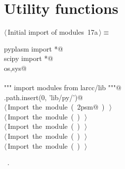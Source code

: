 \documentclass[11pt,oneside]{article}	%
\begin{document}
\appendix
\section{Utility functions}

\begin{flushleft} \small \label{scrap36}
\protect{}$\langle\,$Initial import of modules\nobreak\ {\footnotesize 17a}$\,\rangle\equiv$
\vspace{-1ex}
\begin{list}{}{} \item
\mbox{}\verb@from pyplasm import *@\\
\mbox{}\verb@from scipy import *@\\
\mbox{}\verb@import os,sys@\\
\mbox{}\verb@@\\
\mbox{}\verb@""" import modules from larcc/lib """@\\
\mbox{}\verb@sys.path.insert(0, 'lib/py/')@\\
\mbox{}\verb@@\hbox{$\langle\,$Import the module\nobreak\ ({\footnotesize {}\label{scrap37}
 }\mbox{}\verb@lar2psm@ ) {\footnotesize {}}$\,\rangle$}\verb@@\\
\mbox{}\verb@@\hbox{$\langle\,$Import the module\nobreak\ ({\footnotesize {}\label{scrap38}
 }\mbox{}\verb@simplexn@ ) {\footnotesize {}}$\,\rangle$}\verb@@\\
\mbox{}\verb@@\hbox{$\langle\,$Import the module\nobreak\ ({\footnotesize {}\label{scrap39}
 }\mbox{}\verb@larcc@ ) {\footnotesize {}}$\,\rangle$}\verb@@\\
\mbox{}\verb@@\hbox{$\langle\,$Import the module\nobreak\ ({\footnotesize {}\label{scrap40}
 }\mbox{}\verb@largrid@ ) {\footnotesize {}}$\,\rangle$}\verb@@\\
\mbox{}\verb@@\hbox{$\langle\,$Import the module\nobreak\ ({\footnotesize {}\label{scrap41}
 }\mbox{}\verb@myfont@ ) {\footnotesize {}}$\,\rangle$}\verb@@\\
\mbox{}\verb@@{\NWsep}
\end{list}
\vspace{-1ex}
\footnotesize\addtolength{\baselineskip}{-1ex}
\begin{list}{}{\setlength{\itemsep}{-\parsep}\setlength{\itemindent}{-\leftmargin}}
\item \NWtxtMacroRefIn\ .
\end{list}
\end{flushleft}
\end{document}
